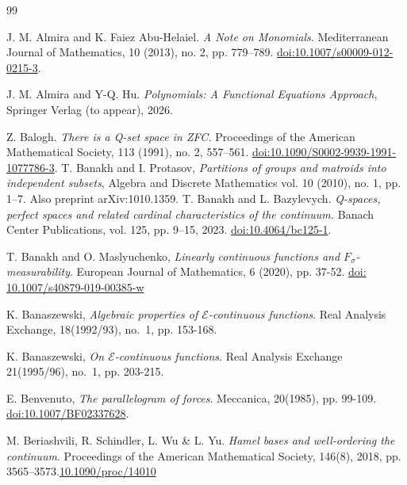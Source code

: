 \documentclass[11pt]{amsart} %
\theoremstyle{definition}
\newcommand{\cE}{\mathcal{E}}
\begin{document}
\begin{thebibliography}{99}

 J. M. Almira and K. Faiez Abu-Helaiel. \emph{A Note on Monomials}. Mediterranean Journal of Mathematics, 10 (2013), no. 2, pp. 779--789. \href{https://doi.org/10.1007/s00009-012-0215-3}{doi:10.1007/s00009-012-0215-3}.

 J. M. Almira and Y-Q. Hu. 
\emph{Polynomials: A Functional Equations Approach}, Springer Verlag (to appear), 2026. 

 Z. Balogh. \emph{There is a Q-set space in ZFC.} Proceedings of the American Mathematical Society, 113 (1991), no. 2, 557--561. \href{https://doi.org/10.1090/S0002-9939-1991-1077786-3}{doi:10.1090/S0002-9939-1991-1077786-3}.
 T. Banakh and I. Protasov, \emph{Partitions of groups and matroids into independent subsets}, Algebra and Discrete Mathematics vol. 10 (2010), no. 1, pp. 1--7. Also preprint arXiv:1010.1359.
 T. Banakh and L. Bazylevych. \emph{Q-spaces, perfect spaces and related cardinal characteristics of the continuum.} Banach Center Publications, vol. 125, pp. 9--15, 2023. \href{https://doi.org/10.4064/bc125-1}{doi:10.4064/bc125-1}.

 T. Banakh and O. Maslyuchenko,
\newblock \emph{Linearly continuous functions and $F_\sigma$-measurability}.
\newblock European Journal of Mathematics, 6 (2020), pp. 37-52. \href{https://doi.org/10.1007/s40879-019-00385-w}{doi: 10.1007/s40879-019-00385-w}


 K. Banaszewski,
\newblock \emph{Algebraic properties of $\cE$-continuous functions}. 
\newblock Real Analysis Exchange, 18(1992/93), no.~1, pp. 153-168.

 K. Banaszewski,
\newblock \emph{On $\cE$-continuous functions}. 
\newblock Real Analysis Exchange 21(1995/96), no.~1, pp. 203-215.

 E. Benvenuto,
\newblock \emph{The parallelogram of forces}. 
\newblock Meccanica, 20(1985), pp. 99-109. \href{https://doi.org/10.1007/BF02337628}{doi:10.1007/BF02337628}. 




 M. Beriashvili, R. Schindler, L. Wu \& L. Yu. \emph{Hamel bases and well-ordering the continuum}. Proceedings of the American Mathematical Society, 146(8), 2018, pp. 3565--3573.\href{https://doi.org/10.1090/proc/14010}{10.1090/proc/14010}


\end{thebibliography}
\end{document}
